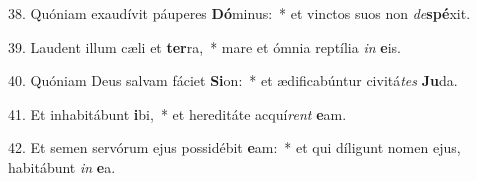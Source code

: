 38. Quóniam exaudívit páuperes \textbf{Dó}minus:~*  et vinctos suos non \textit{de}\textbf{spé}xit.\

39. Laudent illum cæli et \textbf{ter}ra,~*  mare et ómnia reptília \textit{in} \textbf{e}is.\

40. Quóniam Deus salvam fáciet \textbf{Si}on:~*  et ædificabúntur civitá\textit{tes} \textbf{Ju}da.\

41. Et inhabitábunt \textbf{i}bi,~*  et hereditáte acquí\textit{rent} \textbf{e}am.\

42. Et semen servórum ejus possidébit \textbf{e}am:~*  et qui díligunt nomen ejus, habitábunt \textit{in} \textbf{e}a.\

